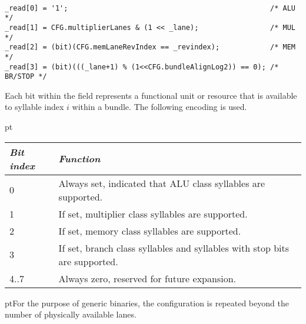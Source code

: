 \  %

\declaration{}
\implementation{}
\begin{lstlisting}
_read[0] = '1';                                                /* ALU */
_read[1] = CFG.multiplierLanes & (1 << _lane);                 /* MUL */
_read[2] = (bit)(CFG.memLaneRevIndex == _revindex);            /* MEM */
_read[3] = (bit)(((_lane+1) % (1<<CFG.bundleAlignLog2)) == 0); /* BR/STOP */
\end{lstlisting}


Each bit within the field represents a functional unit or resource that is
available to syllable index $i$ within a bundle. The following encoding is used.

 pt\noindent\begin{tabular}{|l|p{12cm}|}
\hline
\emph{Bit index} & \emph{Function} \\
\hline
0 & Always set, indicated that ALU class syllables are supported. \\
\hline
1 & If set, multiplier class syllables are supported. \\
\hline
2 & If set, memory class syllables are supported. \\
\hline
3 & If set, branch class syllables and syllables with stop bits are supported. \\
\hline
4..7 & Always zero, reserved for future expansion. \\
\hline
\end{tabular}

 pt\noindent For the purpose of generic binaries, the configuration is 
repeated beyond the number of physically available lanes.

